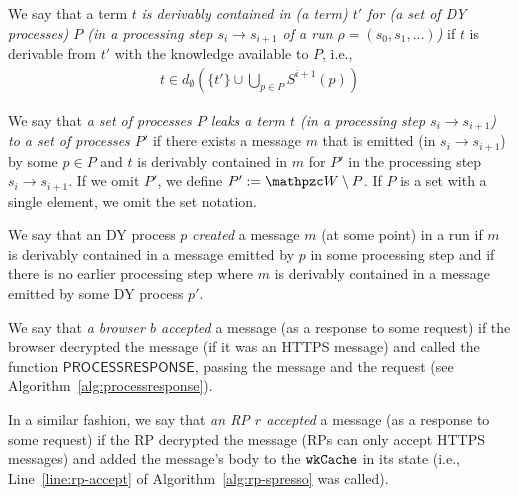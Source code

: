 \begin{theorem}
\begin{definition}\label{def:contains}
  We say that a term $t$ \emph{is derivably contained in (a term) $t'$
    for (a set of DY processes) $P$ (in a processing step $s_i
    \rightarrow s_{i+1}$ of a run $\rho=(s_0,s_1,\ldots)$)} if $t$ is
  derivable from $t'$ with the knowledge available to $P$, i.e.,
  \begin{align*}
    t \in d_{\emptyset}(\{t'\} \cup \bigcup_{p\in P}S^{i+1}(p))
  \end{align*}

\end{definition}

\begin{definition}\label{def:leak}
  We say that \emph{a set of processes $P$ leaks a term $t$ (in a
    processing step $s_i \rightarrow s_{i+1}$) to a set of processes
    $P'$} if there exists a message $m$ that is emitted (in $s_i
  \rightarrow s_{i+1}$) by some $p \in P$ and $t$ is derivably
  contained in $m$ for $P'$ in the processing step $s_i \rightarrow
  s_{i+1}$. If we omit $P'$, we define $P' := \bidsystem \setminus
  P$. If $P$ is a set with a single element, we omit the set notation.
\end{definition}

\begin{definition}\label{def:creating}
  We say that an DY process $p$ \emph{created} a message $m$ (at
  some point) in a run if $m$ is derivably contained in a message
  emitted by $p$ in some processing step and if there is no earlier
  processing step where $m$ is derivably contained in a message
  emitted by some DY process $p'$.
\end{definition}


\begin{definition}\label{def:accepting}
  We say that \emph{a browser $b$ accepted} a message (as a response
  to some request) if the browser decrypted the message (if it was an
  HTTPS message) and called the function $\mathsf{PROCESSRESPONSE}$,
  passing the message and the request (see
  Algorithm~\ref{alg:processresponse}).
\end{definition}

\begin{definition}\label{def:rp-accepting}
  In a similar fashion, we say that \emph{an RP $r$ accepted} a
  message (as a response to some request) if the RP decrypted the
  message (RPs can only accept HTTPS messages) and added the message's
  body to the $\mathtt{wkCache}$ in its state (i.e.,
  Line~\ref{line:rp-accept} of Algorithm~\ref{alg:rp-spresso} was called).
\end{definition}



\end{theorem}
